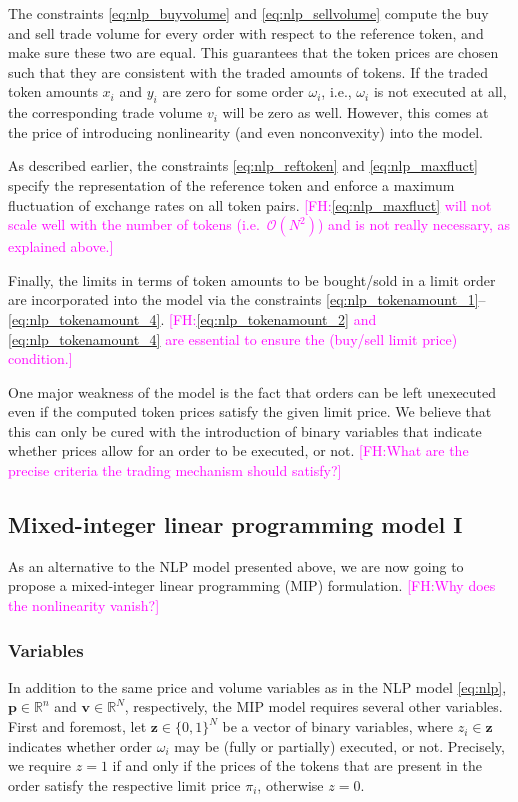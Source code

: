 \documentclass[11pt,parskip=full]{scrartcl}%
\newcommand*{\ie}{i.e., }
\newcommand*{\wrt}{with respect to }
\newcommand{\FH}[1]{\textcolor{magenta}{[FH:#1]}}
\begin{document}
The constraints \eqref{eq:nlp_buyvolume} and \eqref{eq:nlp_sellvolume} compute the buy and sell
trade volume for every order \wrt the reference token, and make sure these two are equal.
This guarantees that the token prices are chosen such that they are consistent with the traded
amounts of tokens.
If the traded token amounts $ x_i $ and $ y_i $ are zero for some order $ \omega_i $, \ie
$ \omega_i $ is not executed at all, the corresponding trade volume $ v_i $ will be zero as well.
However, this comes at the price of introducing nonlinearity (and even nonconvexity) into the
model.

As described earlier, the constraints \eqref{eq:nlp_reftoken} and \eqref{eq:nlp_maxfluct} specify
the representation of the reference token and enforce a maximum fluctuation of exchange rates on
all token pairs.
\FH{\eqref{eq:nlp_maxfluct} will not scale well with the number of tokens (i.e.\ $\mathcal O(N^2)$) and is not really necessary, as explained above.}

Finally, the limits in terms of token amounts to be bought/sold in a limit order are incorporated
into the model via the constraints \eqref{eq:nlp_tokenamount_1}--\eqref{eq:nlp_tokenamount_4}.
\FH{\eqref{eq:nlp_tokenamount_2} and \eqref{eq:nlp_tokenamount_4} are essential to ensure the (buy/sell limit price) condition.}

One major weakness of the model is the fact that orders can be left unexecuted even if the computed
token prices satisfy the given limit price.
We believe that this can only be cured with the introduction of binary variables that indicate
whether prices allow for an order to be executed, or not.
\FH{What are the precise criteria the trading mechanism should satisfy?}


\subsection{Mixed-integer linear programming model I}
\label{subsec:MIPmodel_1}

As an alternative to the NLP model presented above, we are now going to propose a
mixed-integer linear programming (MIP) formulation.
\FH{Why does the nonlinearity vanish?}

\subsubsection*{Variables}

In addition to the same price and volume variables as in the NLP model \eqref{eq:nlp},
$ \mathbf{p} \in \mathbb{R}^n $ and $ \mathbf{v} \in \mathbb{R}^N $, respectively, the MIP model
requires several other variables.
First and foremost, let $ \mathbf{z} \in \{0,1\}^N $ be a vector of binary variables, where $ z_i
\in \mathbf{z} $ indicates whether order $ \omega_i $ may be (fully or partially) executed, or not.
Precisely, we require $ z = 1 $ if and only if the prices of the tokens that are present in the
order satisfy the respective limit price $ \pi_i $, otherwise $ z = 0 $.
\end{document}
